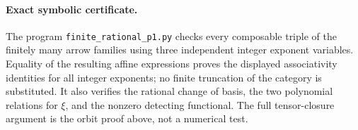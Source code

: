 \paragraph{Exact symbolic certificate.}
The program \texttt{finite\_rational\_p1.py} checks every composable
triple of the finitely many arrow families using three independent
integer exponent variables. Equality of the resulting affine
expressions proves the displayed associativity identities for all
integer exponents; no finite truncation of the category is substituted.
It also verifies the rational change of basis, the two polynomial
relations for $\xi$, and the nonzero detecting functional. The full
tensor-closure argument is the orbit proof above, not a numerical test.
